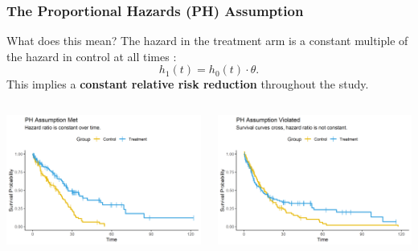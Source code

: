 \documentclass{beamer}
\begin{document}
\begin{frame}
\frametitle{The Proportional Hazards (PH) Assumption}
\begin{block}{What does this mean?}
The hazard in the treatment arm is a constant multiple of the hazard in control at all times \cite{cox1972}:
\[
h_1(t) = h_0(t) \cdot \theta.
\]
This implies a \textbf{constant relative risk reduction} throughout the study.
\end{block}

\begin{columns}
\begin{column}{0.5\textwidth}
    \includegraphics[width=\textwidth]{images/ph_assumption_met.png}
\end{column}
\begin{column}{0.5\textwidth}
    \includegraphics[width=\textwidth]{images/ph_assumption_violated.png}
\end{column}
\end{columns}
\end{frame}
\end{document}
